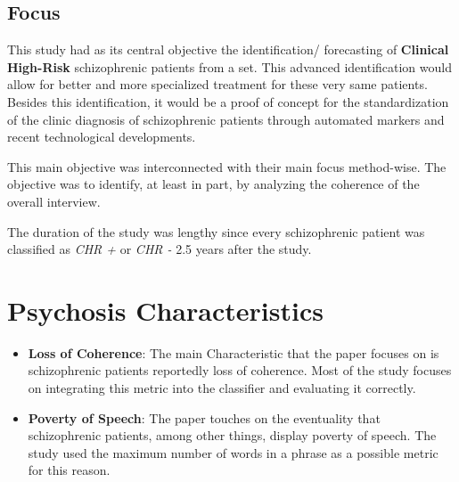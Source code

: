 \documentclass{Paper_Summary}
\begin{document}
\makepapertitle

\breakline

\begin{center}
    \section*{Focus}
\end{center}
    
    This study had as its central objective the identification/ forecasting of \textbf{Clinical High-Risk} schizophrenic patients from a set. This advanced identification would allow for better and more specialized treatment for these very same patients. Besides this identification, it would be a proof of concept for the standardization of the clinic diagnosis of schizophrenic patients through automated markers and recent technological developments.

    This main objective was interconnected with their main focus method-wise. The objective was to identify, at least in part, by analyzing the coherence of the overall interview.

    The duration of the study was lengthy since every schizophrenic patient was classified as \emph{CHR +} or \emph{CHR -} 2.5 years after the study.

\breakline

\newpage

\section{Psychosis Characteristics}
    \begin{itemize}
        \item \textbf{Loss of Coherence}: The main Characteristic that the paper focuses on is schizophrenic patients reportedly loss of coherence. Most of the study focuses on integrating this metric into the classifier and evaluating it correctly.
        \item \textbf{Poverty of Speech}: The paper touches on the eventuality that schizophrenic patients, among other things, display poverty of speech. The study used the maximum number of words in a phrase as a possible metric for this reason.
    \end{itemize}
\end{document}
